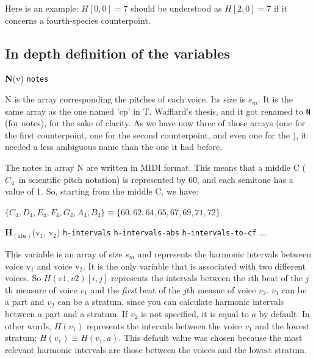 Here is an example: $H[0, 0] = 7$ should be understood as $H[2, 0] = 7$ if it concerns a fourth-species counterpoint.

\subsection{In depth definition of the variables} \label{section:definition-variables}

\noindent \textbf{N}(v) \hspace{.2cm} \texttt{notes} 

N is the array corresponding the pitches of each voice. Its size is $s_m$. It is the same array as the one named 'cp' in T. Wafflard's thesis, and it got renamed to \texttt{N} (for notes), for the sake of clarity. As we have now three of those arrays (one for the first counterpoint, one for the second counterpoint, and even one for the \cf), it needed a less ambiguous name than the one it had before. 

The notes in array N are written in MIDI format. This means that a middle C ($C_4$~in scientific pitch notation) is represented by 60, and each semitone has a value of 1. So, starting from the middle C, we have:

$\{C_4, D_4, E_4, F_4, G_4, A_4, B_4\} \equiv \{60, 62, 64, 65, 67, 69, 71, 72\}$.




\vspace{.5cm} \noindent \textbf{H}$_{(\text{abs})}$(v$_1$, v$_2$) \hspace{.2cm} \texttt{h-intervals}\hspace{.2cm} \texttt{h-intervals-abs}\hspace{.2cm} \texttt{h-intervals-to-cf}\hspace{.2cm}  ...

This variable is an array of size $s_m$ and represents the harmonic intervals between voice v$_1$ and voice v$_2$. It is the only variable that is associated with two different voices. So $H(v1,v2)[i,j]$ represents the intervals between the $i$th beat of the $j$th measure of voice $v_1$ and the \textit{first} beat of the $j$th measue of voice $v_2$. $v_1$ can be a part and $v_2$ can be a stratum, since you can calculate harmonic intervals between a part and a stratum. If $v_2$ is not specified, it is equal to $a$ by default. In other words, $H(v_1)$ represents the intervals between the voice $v_1$ and the lowest stratum: $H(v_1) \equiv H(v_1,a)$. This default value was chosen because the most relevant harmonic intervals are those between the voices and the lowest stratum.

